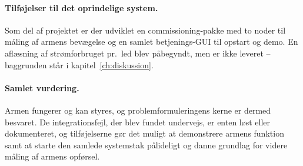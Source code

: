 \paragraph{Tilføjelser til det oprindelige system.}
Som del af projektet er der udviklet en commissioning-pakke med to
noder til måling af armens bevægelse og en samlet betjenings-GUI
til opstart og demo. En aflæsning af strømforbruget pr.~led blev
påbegyndt, men er ikke leveret -- baggrunden står i
kapitel~\ref{ch:diskussion}.

\paragraph{Samlet vurdering.}
Armen fungerer og kan styres, og problemformuleringens kerne er
dermed besvaret. De integrationsfejl, der blev fundet undervejs,
er enten løst eller dokumenteret, og tilføjelserne gør det muligt
at demonstrere armens funktion samt at starte den samlede
systemstak pålideligt og danne grundlag for videre måling af
armens opførsel.

